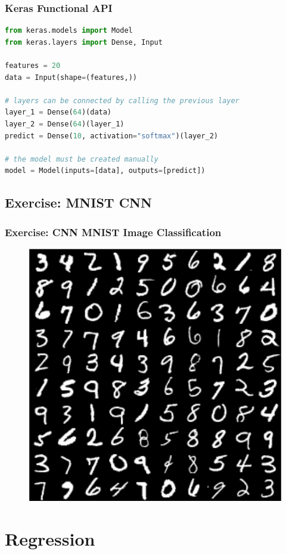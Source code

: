 \documentclass[aspectratio=169]{beamer}
\begin{document}
\begin{frame}[fragile]
\frametitle{Keras Functional API}

\begin{lstlisting}[language=Python]
from keras.models import Model
from keras.layers import Dense, Input

features = 20
data = Input(shape=(features,))

# layers can be connected by calling the previous layer
layer_1 = Dense(64)(data)
layer_2 = Dense(64)(layer_1)
predict = Dense(10, activation="softmax")(layer_2)

# the model must be created manually
model = Model(inputs=[data], outputs=[predict])
\end{lstlisting}

\end{frame}

\subsection{Exercise: MNIST CNN}
\label{subsec:cnn-exercise}

\begin{frame}
\frametitle{Exercise: CNN MNIST Image Classification}

\begin{figure}
    \centering
    \includegraphics[width=0.4\linewidth]{mnist.png}
\end{figure}
\end{frame}

\section{Regression}
\label{sec:regression}
\end{document}

